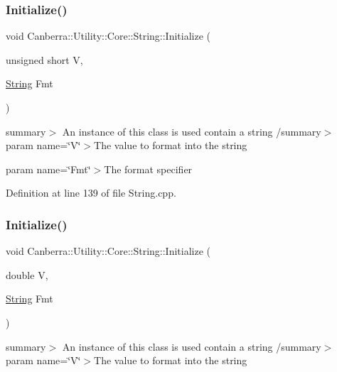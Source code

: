 \subsubsection{\texorpdfstring{Initialize()}{Initialize()}\hspace{0.1cm}{\footnotesize\ttfamily [6/8]}}
{\footnotesize\ttfamily void Canberra\+::\+Utility\+::\+Core\+::\+String\+::\+Initialize (\begin{DoxyParamCaption}\item[{unsigned short}]{V,  }\item[{\hyperlink{class_canberra_1_1_utility_1_1_core_1_1_string}{String}}]{Fmt }\end{DoxyParamCaption})\hspace{0.3cm}{\ttfamily [protected]}}

summary$>$ An instance of this class is used contain a string /summary$>$ param name=\char`\"{}\+V\char`\"{}$>$The value to format into the string

param name=\char`\"{}\+Fmt\char`\"{}$>$The format specifier

Definition at line 139 of file String.\+cpp.

\mbox{\label{class_canberra_1_1_utility_1_1_core_1_1_string_a0f57eb8d226bedb2922f2dad0cb0a607_a0f57eb8d226bedb2922f2dad0cb0a607}} 
\subsubsection{\texorpdfstring{Initialize()}{Initialize()}\hspace{0.1cm}{\footnotesize\ttfamily [7/8]}}
{\footnotesize\ttfamily void Canberra\+::\+Utility\+::\+Core\+::\+String\+::\+Initialize (\begin{DoxyParamCaption}\item[{double}]{V,  }\item[{\hyperlink{class_canberra_1_1_utility_1_1_core_1_1_string}{String}}]{Fmt }\end{DoxyParamCaption})\hspace{0.3cm}{\ttfamily [protected]}}

summary$>$ An instance of this class is used contain a string /summary$>$ param name=\char`\"{}\+V\char`\"{}$>$The value to format into the string

